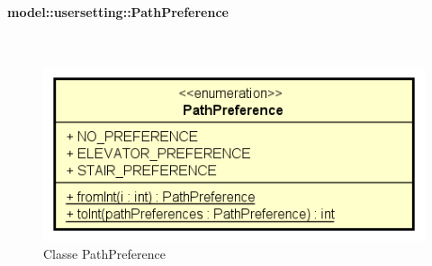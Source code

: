 \documentclass[../DefinizioneDiProdotto.tex]{subfiles}
\begin{document}
\paragraph{model::usersetting::PathPreference}
\
\begin{figure}[H]
	\centering
	\includegraphics[width=\maxwidth]{img/PathPreference.png}
	\caption{Classe PathPreference}\label{fig:model::usersetting::PathPreference} 
\end{figure}
\end{document}
